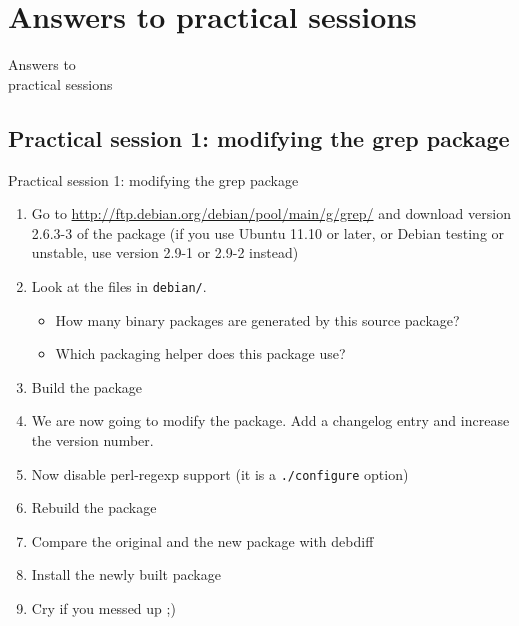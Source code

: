 \documentclass[10pt,final]{beamer}
\begin{document}
\section{Answers to practical sessions}

\begin{frame}
	\begin{center}
		\LARGE Answers to\\[0.5em]  practical sessions
	\end{center}
\end{frame}


\subsection{Practical session 1: modifying the grep package}

\begin{frame}{Practical session 1: modifying the grep package}
\begin{enumerate}
  \item Go to \url{http://ftp.debian.org/debian/pool/main/g/grep/} and
    download version 2.6.3-3 of the package (if you use Ubuntu 11.10 or
    later, or Debian testing or unstable, use version 2.9-1 or 2.9-2 instead)

	\item Look at the files in \texttt{debian/}.
		\begin{itemize}
			\item 		How many binary packages are generated by this source package?
			\item 		Which packaging helper does this package use?
		\end{itemize}
    \hbr
	\item Build the package
    \hbr
	\item We are now going to modify the package. Add a changelog entry and increase the version number.
    \hbr
	\item Now disable perl-regexp support (it is a \texttt{./configure} option)
    \hbr
	\item Rebuild the package
    \hbr
	\item Compare the original and the new package with debdiff
    \hbr
	\item Install the newly built package
    \hbr
	\item Cry if you messed up ;)
\end{enumerate}
\end{frame}
\end{document}
